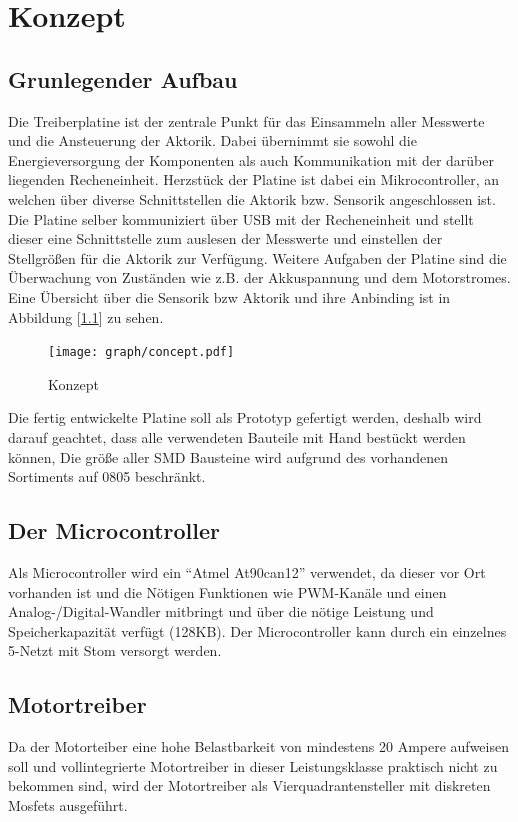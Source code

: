 
\chapter{Konzept}

\section{Grunlegender Aufbau}

Die Treiberplatine ist der zentrale Punkt für das Einsammeln aller Messwerte und die Ansteuerung der Aktorik. Dabei übernimmt sie sowohl die Energieversorgung der Komponenten als auch
Kommunikation mit der darüber liegenden Recheneinheit. Herzstück der Platine ist dabei ein Mikrocontroller, an welchen über diverse Schnittstellen die Aktorik bzw. Sensorik
angeschlossen ist. Die Platine selber kommuniziert über USB mit der Recheneinheit und stellt dieser eine Schnittstelle zum auslesen der Messwerte und einstellen der Stellgrößen für die Aktorik
zur Verfügung. Weitere Aufgaben der Platine sind die Überwachung von Zuständen wie z.B. der Akkuspannung und dem Motorstromes. Eine Übersicht über die Sensorik bzw Aktorik und ihre Anbinding ist in 
Abbildung [\ref{fig:konzept}] zu sehen.

\begin{figure}[H]
\centering
\texttt{[image: graph/concept.pdf]}\\
\caption{Konzept}
\label{fig:konzept}
\end{figure}


Die fertig entwickelte Platine soll als Prototyp gefertigt werden, deshalb wird darauf geachtet, dass alle verwendeten Bauteile mit Hand bestückt werden können,
Die größe aller SMD Bausteine wird aufgrund des vorhandenen Sortiments auf 0805 beschränkt.


\section{Der Microcontroller}
Als Microcontroller wird ein ``Atmel At90can12''\cite{ds-at90can} verwendet, da dieser vor Ort vorhanden ist und die Nötigen Funktionen wie PWM-Kanäle und einen Analog-/Digital-Wandler mitbringt und 
über die nötige Leistung und Speicherkapazität verfügt (128KB). Der Microcontroller kann durch ein einzelnes 5-Netzt mit Stom versorgt werden.




\section{Motortreiber}
Da der Motorteiber eine hohe Belastbarkeit von mindestens 20 Ampere aufweisen soll und
vollintegrierte Motortreiber in dieser Leistungsklasse praktisch nicht zu bekommen sind, wird der Motortreiber als Vierquadrantensteller mit diskreten Mosfets ausgeführt.

